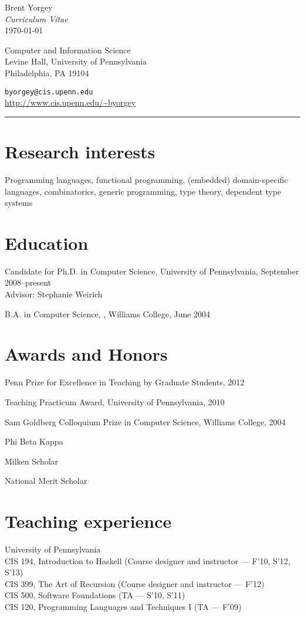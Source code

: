 \documentclass{article}
\newcommand{\cvitem}{\par\hangpara{2em}{1}}
\begin{document}
\begin{center}
  {\huge Brent Yorgey} \\
  \emph{Curriculum Vitae} \\
  \today
\end{center}

\noindent
\parbox{2.5in}{
Computer and Information Science \\
Levine Hall, University of Pennsylvania \\
Philadelphia, PA 19104
}
\hfill
\parbox{2.5in}{
\texttt{byorgey@cis.upenn.edu} \\
\url{http://www.cis.upenn.edu/~byorgey}
}
\medskip

\hrule

\section*{Research interests}
Programming languages, functional programming, (embedded)
domain-specific languages, combinatorics, generic programming, type
theory, dependent type systems

\section*{Education}
\cvitem
Candidate for Ph.D. in Computer Science, University of Pennsylvania,
September 2008--present \\
Advisor: Stephanie Weirich

\cvitem B.A. in Computer Science, , Williams
College, June 2004

\section*{Awards and Honors}
\cvitem Penn Prize for Excellence in Teaching by Graduate Students, 2012
\cvitem Teaching Practicum Award, University of Pennsylvania, 2010
\cvitem Sam Goldberg Colloquium Prize in Computer Science, Williams
College, 2004
\cvitem Phi Beta Kappa
\cvitem Milken Scholar
\cvitem National Merit Scholar

\section*{Teaching experience}

\cvitem
University of Pennsylvania \\
CIS 194, Introduction to Haskell (Course designer and instructor ---
F'10, S'12, S'13) \\
CIS 399, The Art of Recursion (Course designer and instructor ---
F'12) \\
CIS 500, Software Foundations (TA --- S'10, S'11) \\
CIS 120, Programming Languages and Techniques I (TA --- F'09)
\end{document}
